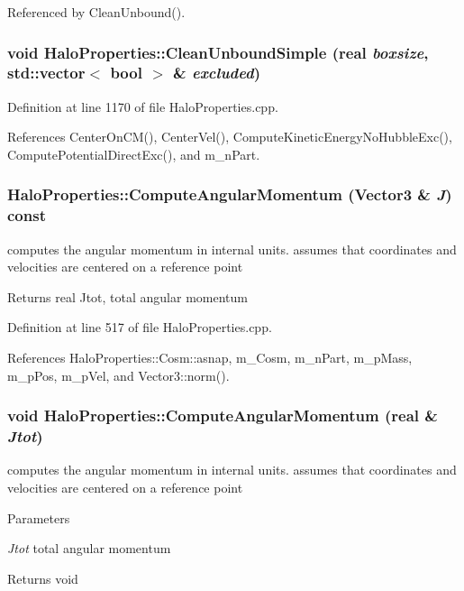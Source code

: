 Referenced by CleanUnbound().

\subsubsection[{CleanUnboundSimple}]{\setlength{\rightskip}{0pt plus 5cm}void HaloProperties::CleanUnboundSimple ({\bf real} {\em boxsize}, \/  std::vector$<$ bool $>$ \& {\em excluded})}\label{classHaloProperties_ad0cd4d6507b2cd05abe9f886d3d5577f}


Definition at line 1170 of file HaloProperties.cpp.



References CenterOnCM(), CenterVel(), ComputeKineticEnergyNoHubbleExc(), ComputePotentialDirectExc(), and m\_\-nPart.

\subsubsection[{ComputeAngularMomentum}]{ HaloProperties::ComputeAngularMomentum ({\bf Vector3} \& {\em J}) const}\label{classHaloProperties_a15228365bc6e1546e47589a4b0403463}
computes the angular momentum in internal units. assumes that coordinates and velocities are centered on a reference point \begin{DoxyReturn}{Returns}
real Jtot, total angular momentum 
\end{DoxyReturn}


Definition at line 517 of file HaloProperties.cpp.



References HaloProperties::Cosm::asnap, m\_\-Cosm, m\_\-nPart, m\_\-pMass, m\_\-pPos, m\_\-pVel, and Vector3::norm().

\subsubsection[{ComputeAngularMomentum}]{\setlength{\rightskip}{0pt plus 5cm}void HaloProperties::ComputeAngularMomentum ({\bf real} \& {\em Jtot})}\label{classHaloProperties_a61d17e98fb59a269786264cd41746720}
computes the angular momentum in internal units. assumes that coordinates and velocities are centered on a reference point 
\begin{DoxyParams}{Parameters}
\item[{\em Jtot}]total angular momentum \end{DoxyParams}
\begin{DoxyReturn}{Returns}
void 
\end{DoxyReturn}


